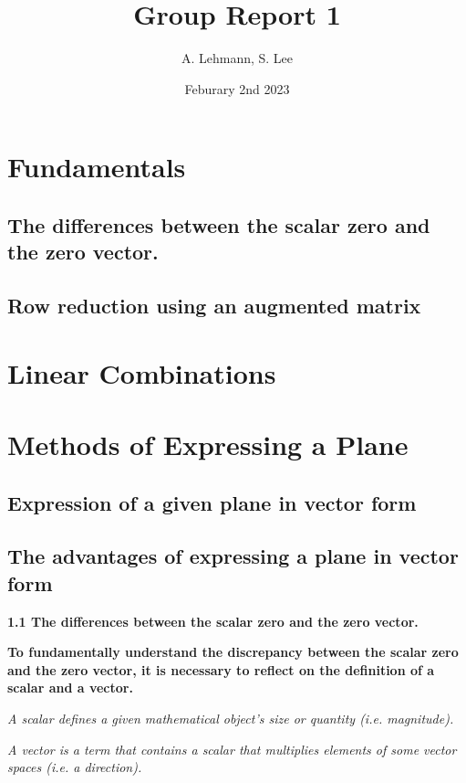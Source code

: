 \documentclass{article}
\title{Group Report 1}
\author{A. Lehmann, S. Lee}
\date{Feburary 2nd 2023}
\begin{document}
	
	\maketitle
	\section{Fundamentals}
	\subsection{The differences between the scalar zero and the zero vector.}
	\subsection{Row reduction using an augmented matrix}
	
	
	\section{Linear Combinations}
	
	\section{Methods of Expressing a Plane}
	\subsection{Expression of a given plane in vector form}
	\subsection{The advantages of expressing a plane in vector form}
	
	
	\clearpage
	
	
	\textbf{1.1 The differences between the scalar zero and the zero vector.}
	
	\textbf{To fundamentally understand the discrepancy between the scalar zero and the zero vector, it is necessary to reflect on the definition of a scalar and a vector.}
	
	\textit{A scalar defines a given mathematical object's size or quantity (i.e. magnitude).}
	
	\textit{A vector is a term that contains a scalar that multiplies elements of some vector spaces (i.e. a direction).}
	
\end{document}
